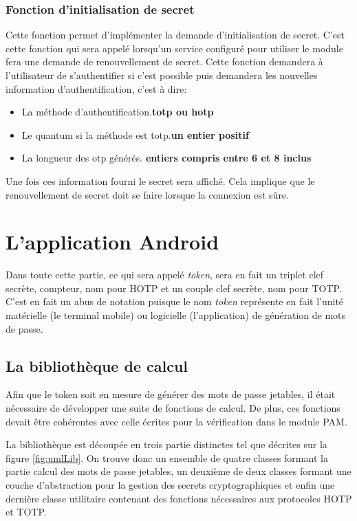 \subsubsection{Fonction d'initialisation de secret}
Cette fonction permet d'implémenter la demande d'initialisation de secret.
C'est cette fonction qui sera appelé lorsqu'un service configuré pour utiliser
le module fera une demande de renouvellement de secret. Cette fonction demandera
à l'utilisateur de s'authentifier si c'est possible puis demandera les nouvelles
information d'authentification, c'est à dire:
\begin{itemize}
  \item La méthode d'authentification.\hfill\textbf{totp ou hotp}
  \item Le quantum si la méthode est totp.\hfill \textbf{un entier positif}
  \item La longueur des otp générés.
  \hfill\textbf{entiers compris entre 6 et 8 inclus}
\end{itemize}
Une fois ces information fourni le secret sera affiché. Cela implique que le
renouvellement de secret doit se faire lorsque la connexion est sûre.

\newpage
\section{L'application Android}
Dans toute cette partie, ce qui sera appelé \emph{token}, sera en fait un triplet clef secrète, 
compteur, nom pour HOTP et un couple clef secrète, nom pour TOTP. C'est en fait un abus de notation
puisque le nom \emph{token} représente en fait l'unité matérielle (le terminal mobile) ou logicielle
(l'application) de génération de mots de passe.

\subsection{La bibliothèque de calcul}
Afin que le token soit en mesure de générer des mots de passe jetables, il était
nécessaire de développer une suite de fonctions de calcul. De plus, ces fonctions devait
être cohérentes avec celle écrites pour la vérification dans le module PAM.

La bibliothèque est découpée en trois partie distinctes tel que décrites sur la figure
\ref{fig:umlLib}. On trouve donc un ensemble de quatre classes formant la partie calcul
des mots de passe jetables, un deuxième de deux classes formant une couche d'abstraction
pour la gestion des secrets cryptographiques et enfin une dernière classe utilitaire
contenant des fonctions nécessaires aux protocoles HOTP et TOTP.

